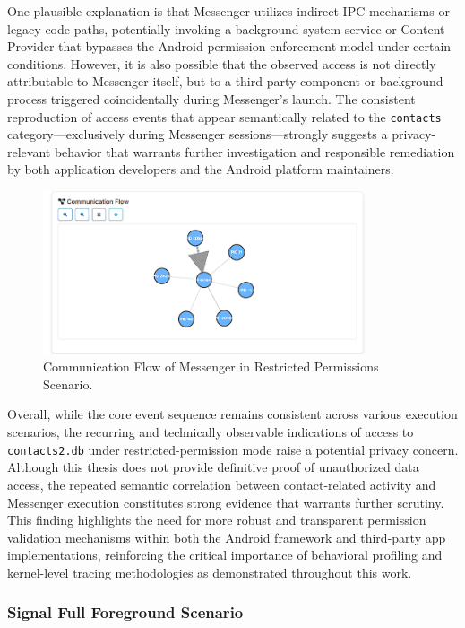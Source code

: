 \documentclass[a4paper,12pt]{report}
\begin{document}
One plausible explanation is that Messenger utilizes indirect IPC mechanisms or legacy code paths, potentially invoking a background system service or Content Provider that bypasses the Android permission enforcement model under certain conditions. However, it is also possible that the observed access is not directly attributable to Messenger itself, but to a third-party component or background process triggered coincidentally during Messenger’s launch. The consistent reproduction of access events that appear semantically related to the \texttt{contacts} category—exclusively during Messenger sessions—strongly suggests a privacy-relevant behavior that warrants further investigation and responsible remediation by both application developers and the Android platform maintainers.

\begin{figure}[H]
\centering
\includegraphics[width=0.85\textwidth]{messenger-none-flow.png}
\caption{Communication Flow of Messenger in Restricted Permissions Scenario.}
\label{fig:messenger-none-flow}
\end{figure}

Overall, while the core event sequence remains consistent across various execution scenarios, the recurring and technically observable indications of access to \texttt{contacts2.db} under restricted-permission mode raise a potential privacy concern. Although this thesis does not provide definitive proof of unauthorized data access, the repeated semantic correlation between contact-related activity and Messenger execution constitutes strong evidence that warrants further scrutiny. This finding highlights the need for more robust and transparent permission validation mechanisms within both the Android framework and third-party app implementations, reinforcing the critical importance of behavioral profiling and kernel-level tracing methodologies as demonstrated throughout this work.
\subsubsection{Signal Full Foreground Scenario}
\end{document}
